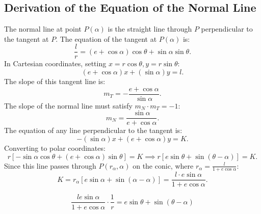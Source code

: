 \subsection{Derivation of the Equation of the Normal Line}
The normal line at point $P(\alpha)$ is the straight line through $P$ perpendicular to the tangent at $P$.
The equation of the tangent at $P(\alpha)$ is:
\begin{equation}
    \frac{l}{r} = (e + \cos\alpha)\cos\theta + \sin\alpha\sin\theta.
\end{equation}
In Cartesian coordinates, setting $x = r\cos\theta, y = r\sin\theta$:
\begin{equation}
    (e + \cos\alpha)x + (\sin\alpha)y = l.
\end{equation}
The slope of this tangent line is:
\begin{equation}
    m_T = -\frac{e + \cos\alpha}{\sin\alpha}.
\end{equation}
The slope of the normal line must satisfy $m_N \cdot m_T = -1$:
\begin{equation}
    m_N = \frac{\sin\alpha}{e + \cos\alpha}.
\end{equation}
The equation of any line perpendicular to the tangent is:
\begin{equation}
    -(\sin\alpha)x + (e + \cos\alpha)y = K.
\end{equation}
Converting to polar coordinates:
\begin{equation}
    r[-\sin\alpha\cos\theta + (e + \cos\alpha)\sin\theta] = K \implies r[e\sin\theta + \sin(\theta - \alpha)] = K.
\end{equation}
Since this line passes through $P(r_\alpha, \alpha)$ on the conic, where $r_\alpha = \frac{l}{1 + e\cos\alpha}$:
\begin{equation}
    K = r_\alpha [e\sin\alpha + \sin(\alpha - \alpha)] = \frac{l \cdot e\sin\alpha}{1 + e\cos\alpha}.
\end{equation}

\begin{theorembox}
\begin{equation}
    \boxed{\frac{le\sin\alpha}{1 + e\cos\alpha} \cdot \frac{1}{r} = e\sin\theta + \sin(\theta - \alpha)}
\end{equation}
\end{theorembox}

\newpage
